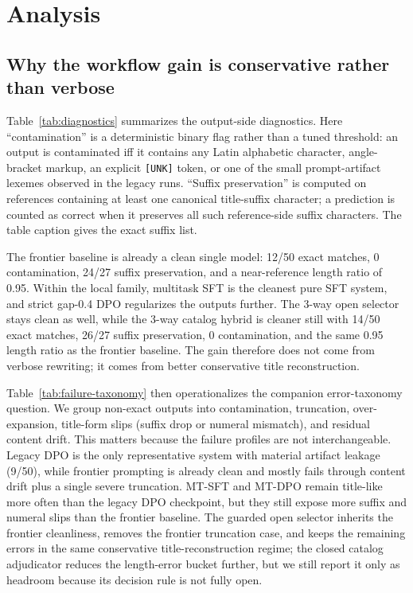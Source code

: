 \section{Analysis}

\subsection{Why the workflow gain is conservative rather than verbose}

Table~\ref{tab:diagnostics} summarizes the output-side diagnostics. Here ``contamination'' is a deterministic binary flag rather than a tuned threshold: an output is contaminated iff it contains any Latin alphabetic character, angle-bracket markup, an explicit \texttt{[UNK]} token, or one of the small prompt-artifact lexemes observed in the legacy runs. ``Suffix preservation'' is computed on references containing at least one canonical title-suffix character; a prediction is counted as correct when it preserves all such reference-side suffix characters. The table caption gives the exact suffix list.

The frontier baseline is already a clean single model: 12/50 exact matches, 0 contamination, 24/27 suffix preservation, and a near-reference length ratio of 0.95. Within the local family, multitask SFT is the cleanest pure SFT system, and strict gap-0.4 DPO regularizes the outputs further. The 3-way open selector stays clean as well, while the 3-way catalog hybrid is cleaner still with 14/50 exact matches, 26/27 suffix preservation, 0 contamination, and the same 0.95 length ratio as the frontier baseline. The gain therefore does not come from verbose rewriting; it comes from better conservative title reconstruction.



Table~\ref{tab:failure-taxonomy} then operationalizes the companion error-taxonomy question. We group non-exact outputs into contamination, truncation, over-expansion, title-form slips (suffix drop or numeral mismatch), and residual content drift. This matters because the failure profiles are not interchangeable. Legacy DPO is the only representative system with material artifact leakage (9/50), while frontier prompting is already clean and mostly fails through content drift plus a single severe truncation. MT-SFT and MT-DPO remain title-like more often than the legacy DPO checkpoint, but they still expose more suffix and numeral slips than the frontier baseline. The guarded open selector inherits the frontier cleanliness, removes the frontier truncation case, and keeps the remaining errors in the same conservative title-reconstruction regime; the closed catalog adjudicator reduces the length-error bucket further, but we still report it only as headroom because its decision rule is not fully open.

